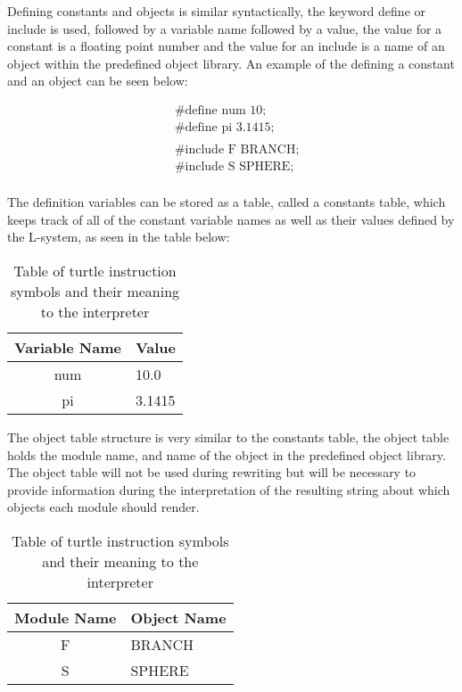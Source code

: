 Defining constants and objects is similar syntactically, the keyword define or include is used, followed by a variable name followed by a value, the value for a constant is a floating point number and the value for an include is a name of an object within the predefined object library. An example of the defining a constant and an object can be seen below: 

\begin{equation} \label{constant and object example}
\begin{aligned}
	&\text{\#define num 10;}\\
	&\text{\#define pi 3.1415;}\\
	&\\
	&\text{\#include F BRANCH;}\\
	&\text{\#include S SPHERE;}\\
\end{aligned}
\end{equation}

\noindent
The definition variables can be stored as a table, called a constants table, which keeps track of all of the constant variable names as well as their values defined by the L-system, as seen in the table below: 

\begin{table}[h!] \center
\begin{tabular}{ | c | l | }
\hline
	Variable Name 	& Value\\  
\hline
\hline
	num 				& 10.0\\
\hline
	pi					& 3.1415\\
\hline
\end{tabular}
\caption{Table of turtle instruction symbols and their meaning to the interpreter}
\label{constants table}
\end{table}
\FloatBarrier

\noindent
The object table structure is very similar to the constants table, the object table holds the module name, and name of the object in the predefined object library. The object table will not be used during rewriting but will be necessary to provide information during the interpretation of the resulting string about which objects each module should render. 

\begin{table}[h!] \center
\begin{tabular}{ | c | l | }
\hline
	Module Name	& Object Name\\  
\hline
\hline
	F 				& BRANCH\\
\hline
	S				& SPHERE\\
\hline
\end{tabular}
\caption{Table of turtle instruction symbols and their meaning to the interpreter}
\label{constants table}
\end{table}
\FloatBarrier

